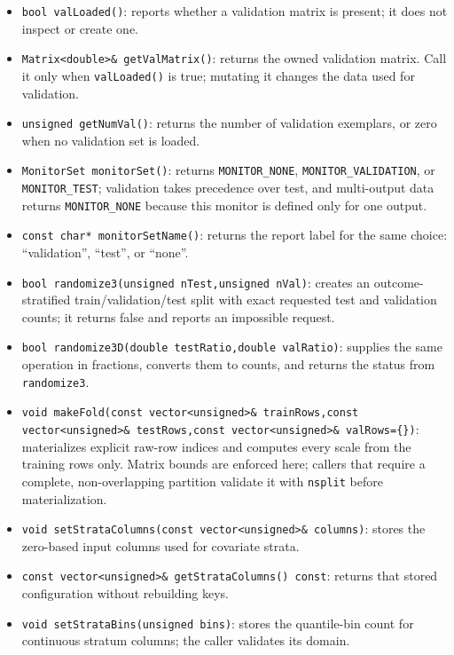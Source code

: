 \begin{itemize}
\item \texttt{bool valLoaded()}: reports whether a validation matrix is
      present; it does not inspect or create one.
\item \texttt{Matrix<double>\& getValMatrix()}: returns the owned validation
      matrix.  Call it only when \texttt{valLoaded()} is true; mutating it
      changes the data used for validation.
\item \texttt{unsigned getNumVal()}: returns the number of validation
      exemplars, or zero when no validation set is loaded.
\item \texttt{MonitorSet monitorSet()}: returns \texttt{MONITOR\_NONE},
      \texttt{MONITOR\_VALIDATION}, or \texttt{MONITOR\_TEST};
      validation takes precedence over test, and multi-output data returns
      \texttt{MONITOR\_NONE} because this monitor is defined only for one output.
\item \texttt{const char* monitorSetName()}: returns the report label for the
      same choice: ``validation'', ``test'', or ``none''.
\item \texttt{bool randomize3(unsigned nTest,unsigned nVal)}: creates an
      outcome-stratified train/validation/test split with exact requested test
      and validation counts; it returns false and reports an impossible request.
\item \texttt{bool randomize3D(double testRatio,double valRatio)}: supplies the
      same operation in fractions, converts them to counts, and returns the
      status from \texttt{randomize3}.
\item \texttt{void makeFold(const vector<unsigned>\& trainRows,const
      vector<unsigned>\& testRows,const vector<unsigned>\& valRows=\{\})}:
      materializes explicit raw-row indices and computes every scale from the
      training rows only.  Matrix bounds are enforced here; callers that require
      a complete, non-overlapping partition validate it with \texttt{nsplit}
      before materialization.
\item \texttt{void setStrataColumns(const vector<unsigned>\& columns)}: stores
      the zero-based input columns used for covariate strata.
\item \texttt{const vector<unsigned>\& getStrataColumns() const}: returns that
      stored configuration without rebuilding keys.
\item \texttt{void setStrataBins(unsigned bins)}: stores the quantile-bin count
      for continuous stratum columns; the caller validates its domain.

\end{itemize}
